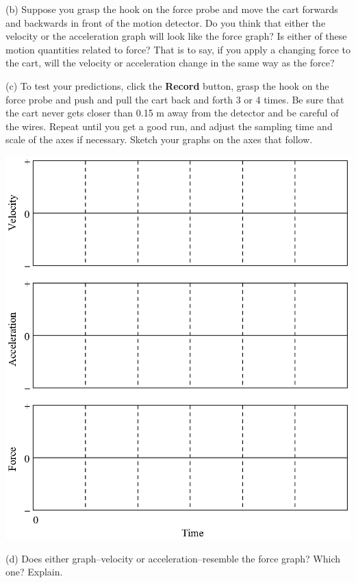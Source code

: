 (b) Suppose you grasp the hook on the force probe and move the cart forwards
and backwards in front of the motion detector. Do you think that either the
velocity or the acceleration graph will look like the force graph? Is either
of these motion quantities related to force? That is to say, if you apply a
changing force to the cart, will the velocity or acceleration change in the
same way as the force?
\answerspace{35mm}

\pagebreak[3]
(c) To test your predictions, click the \textbf{Record} button, grasp the
hook on the force probe and push and pull the cart back and forth 3 or 4 times. Be sure that
the cart never gets closer than 0.15 m away from the detector and be careful
of the wires. Repeat until you get a good run, and adjust the sampling time
and scale of the axes if necessary. Sketch your graphs on the axes that follow.

\vspace{0.3cm}
{\par\centering \includegraphics{force1/force1_fig2.eps} \par}
\vspace{0.3cm}

(d) Does either graph--velocity or acceleration--resemble the force graph? Which
one? Explain.
\answerspace{20mm}

